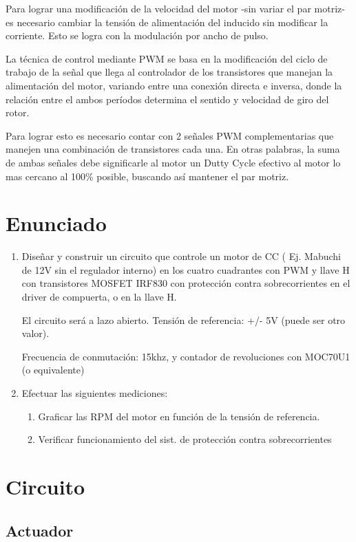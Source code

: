 \documentclass[11pt, a4paper]{article}
\begin{document}
Para lograr una modificación de la velocidad del motor -sin variar el par motriz- es necesario cambiar la tensión de alimentación del inducido sin modificar la corriente. Esto se logra con la modulación por ancho de pulso. 

La técnica de control mediante PWM se basa en la modificación del ciclo de trabajo de la señal que llega al controlador de los transistores que manejan la alimentación del motor, variando entre una conexión directa e inversa, donde la relación entre el ambos períodos determina el sentido y velocidad de giro del rotor.

Para lograr esto es necesario contar con 2 señales PWM complementarias que manejen una combinación de transistores cada una. En otras palabras, la suma de ambas señales debe significarle al motor un Dutty Cycle efectivo al motor lo mas cercano al 100\% posible, buscando así mantener el par motriz.


\section{Enunciado}
\begin{enumerate}
	\item Diseñar y construir un circuito que controle un motor de CC ( Ej. Mabuchi de 12V sin el regulador interno) en los cuatro cuadrantes con PWM y llave H con transistores MOSFET IRF830 con protección contra sobrecorrientes en el driver de compuerta, o en la llave H.
	
	El circuito será a lazo abierto. Tensión de referencia: +/- 5V (puede ser otro valor).
	
	Frecuencia de conmutación: 15khz, y contador de revoluciones con MOC70U1 (o equivalente)

	\item Efectuar las siguientes mediciones:
	\begin{enumerate}
		\item Graficar las RPM del motor en función de la tensión de referencia.
		\item Verificar funcionamiento del sist. de protección contra sobrecorrientes
	\end{enumerate}
\end{enumerate}

\section{Circuito}
\subsection{Actuador}
\end{document}
